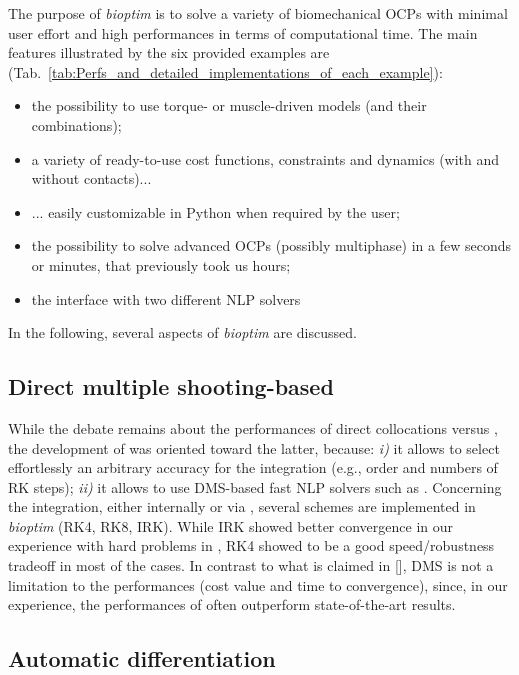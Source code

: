 The purpose of \textit{bioptim} is to solve a variety of biomechanical OCPs with minimal user effort and high performances in terms of computational time. 
The main features illustrated by the six provided examples are (Tab.~\ref{tab:Perfs_and_detailed_implementations_of_each_example}): 
\begin{itemize}
\item the possibility to use torque- or muscle-driven models (and their combinations);
\item a variety of ready-to-use cost functions, constraints and dynamics (with and without contacts)...
\item ... easily customizable in Python when required by the user;
\item the possibility to solve advanced OCPs (possibly multiphase) in a few seconds or minutes, that previously took us hours;
\item the interface with two different NLP solvers
\end{itemize}
In the following, several aspects of \textit{bioptim} are discussed.


\subsection{Direct multiple shooting-based}

While the debate remains about the performances of direct collocations versus  \cite{diehl2006fast}, the development of \bioptim was oriented toward the latter, because: \textit{i)} it allows to select effortlessly an arbitrary accuracy for the integration (e.g., order and numbers of RK steps); \textit{ii)} it allows to use DMS-based fast NLP solvers such as \acados.
Concerning the integration, either internally or via \acados, several schemes are implemented in \textit{bioptim} (RK4, RK8, IRK).
While IRK showed better convergence in our experience with hard problems in \acados, RK4 showed to be a good speed/robustness tradeoff in most of the cases. 
In contrast to what is claimed in [\addref], DMS is not a limitation to the performances (cost value and time to convergence), since, in our experience, the performances of \bioptim often outperform state-of-the-art results.

\subsection{Automatic differentiation}

